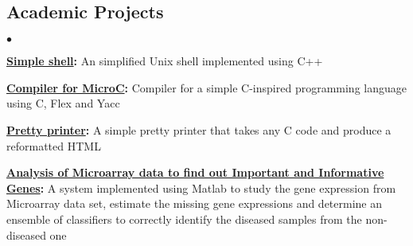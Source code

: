 \documentclass[margin,line]{res}
\newenvironment{list2}{
  \begin{list}{$\bullet$}{%
      \setlength{\itemsep}{0in}
      \setlength{\parsep}{0in} \setlength{\parskip}{0in}
      \setlength{\topsep}{0in} \setlength{\partopsep}{0in} 
      \setlength{\leftmargin}{0.2in}}}{\end{list}}
\begin{document}
\begin{resume}
\section{\sc Academic Projects}
\begin{list2}
\item {\bf \href{https://github.com/sb17v/simple_shell}{Simple shell}:} An 
simplified Unix shell implemented using C++
\item {\bf \href{https://github.com/sb17v/micro-C_compiler}{Compiler for 
MicroC}:} Compiler for a simple C-inspired programming 
language using C, Flex and Yacc
\item {\bf \href{https://github.com/sb17v/pretty_printer}{Pretty printer}:} A 
simple pretty printer that takes any C code and 
produce a reformatted HTML
\item {\bf 
\href{https://github.com/sb17v/Analysis-of-Microarray-Data-to-find-out-Important-and-Informative-Genes}{Analysis
 of Microarray data to find out Important and Informative 
Genes}:} A system implemented using Matlab to study the gene expression from
Microarray data set, estimate the missing gene expressions and determine an 
ensemble of classifiers to correctly identify the diseased samples
from the non-diseased one
\end{list2}

\vspace*{-.18in}




\end{resume}
\end{document}
